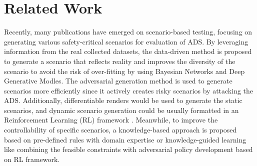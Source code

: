 
\section{Related Work}
\label{sec:relatedwork}
Recently, many publications have emerged on scenario-based testing, focusing on generating various safety-critical scenarios for evaluation of ADS. By leveraging information from the real collected datasets, the data-driven method is proposed to generate a scenario that reflects reality and improves the diversity of the scenario to avoid the risk of over-fitting by using Bayesian Networks\cite{wheeler2016factor} and Deep Generative Modles\cite{ding2018new}. The adversarial generation method is used to generate scenarios more efficiently since it actively creates risky scenarios by attacking the ADS. Additionally, differentiable renders would be used to generate the static scenarios\cite{jain2019analyzing}, and dynamic scenario generation could be usually formatted in an Reinforcement Learning (RL) framework \cite{sun2021corner}. Meanwhile, to improve the controllability of specific scenarios, a knowledge-based approach is proposed based on pre-defined rules with domain expertise\cite{rana2021building} or knowledge-guided learning like combining the feasible constraints with adversarial policy development\cite{cao2023robust} based on RL framework.

